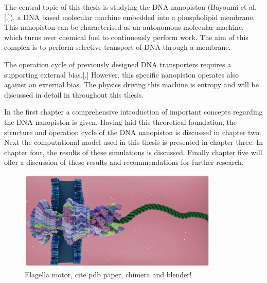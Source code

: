 The central topic of this thesis is studying the DNA nanopiston (Bayoumi et
al.[.]), a DNA based molecular machine embedded into a phospholipid membrane. This
nanopiston can be characterised as an autonomous molecular machine, which turns over
chemical fuel to continuously perform work. The aim of this complex is to perform
selective transport of DNA through a membrane.

The operation cycle of previously designed DNA transporters requires a supporting
external bias.[.] However, this specific nanopiston operates also against an external
bias. The physics driving this machine is entropy and will be discussed in detail in
throughout this thesis.

In the first chapter a comprehensive introduction of important concepts
regarding the DNA nanopiston is given. Having laid this theoretical foundation, the
structure and operation cycle of the DNA nanopiston is discussed in chapter two. Next the
computational model used in this thesis is presented in chapter three. In chapter four,
the results of these simulations is discussed. Finally chapter five will offer a
discussion of these results and recommendations for further research.
\vspace{0.5cm}
\begin{figure}[ht]
\begin{center}
  \includegraphics[width=0.85\textwidth]{Figures/flagella2.png}
  \caption{Flagella motor, cite pdb paper, chimera and blender!}
\end{center}
\end{figure}
